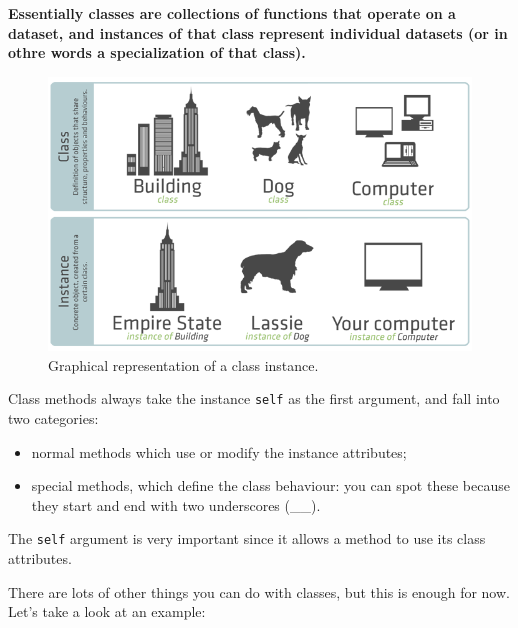 \documentclass[11pt]{article}
\makeatletter
\def\maxwidth{\ifdim\Gin@nat@width>\linewidth\linewidth
    \else\Gin@nat@width\fi}
\let\Oldincludegraphics\includegraphics
\renewcommand{\includegraphics}[1]{\Oldincludegraphics[width=.8\maxwidth]{#1}}
\providecommand{\tightlist}{%
      \setlength{\itemsep}{0pt}\setlength{\parskip}{0pt}}
\makeatother
\begin{document}
\textbf{Essentially classes are collections of functions that operate on
a dataset, and instances of that class represent individual datasets (or
in othre words a specialization of that class).}

\begin{figure}
\centering
\includegraphics{classes_instances.png}
\caption{Graphical representation of a class instance.}
\end{figure}

Class methods always take the instance \texttt{self} as the first
argument, and fall into two categories:

\begin{itemize}
\tightlist
\item
  normal methods which use or modify the instance attributes;
\item
  special methods, which define the class behaviour: you can spot these
  because they start and end with two underscores (\_\_).
\end{itemize}

The \texttt{self} argument is very important since it allows a method to
use its class attributes.

There are lots of other things you can do with classes, but this is
enough for now. Let's take a look at an example:
\end{document}
